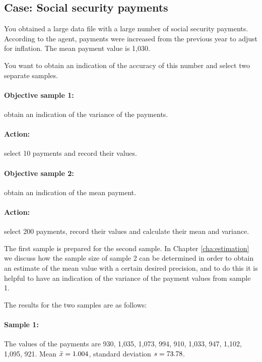 \begin{mdframed}[hidealllines=true,backgroundcolor=KPMG_blue!10, innerleftmargin=0.3cm]
\section*{Case: Social security payments}
You obtained a large data file with a large number of social security payments. According to the agent, payments were increased from the previous year to adjust for inflation. The mean payment value is 1,030.

You want to obtain an indication of the accuracy of this number and select two separate samples.

\paragraph{Objective sample 1:} obtain an indication of the variance of the payments.
\paragraph{Action:} select 10 payments and record their values.

\paragraph{Objective sample 2:} obtain an indication of the mean payment.
\paragraph{Action:} select 200 payments, record their values and calculate their mean and variance.

\bigskip
The first sample is prepared for the second sample. In Chapter \ref{cha:estimation} we discuss how the sample size of sample 2 can be determined in order to obtain an estimate of the mean value with a certain desired precision, and to do this it is helpful to have an indication of the variance of the payment values from sample 1.

\bigskip
The results for the two samples are as follows:

\paragraph{Sample 1:}  The values of the payments are 930, 1,035, 1,073, 994, 910, 1,033, 947, 1,102, 1,095, 921.
Mean $\bar{x} = \ProbSocSecSampleOneMeanDot$, standard deviation $s = \ProbSocSecSampleOneSd$.


\end{mdframed}
